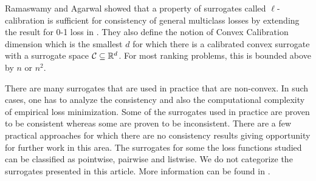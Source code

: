 Ramaswamy and Agarwal \cite{ramaswamy2016convex} showed that a property of
surrogates called $\ell$-calibration is sufficient for consistency of general
multiclass losses by extending the result for 0-1 loss in
\cite{tewari2007consistency}. They also define the notion of Convex Calibration
dimension which is the smallest $d$ for which there is a calibrated convex
surrogate with a surrogate space ${\mathcal C} \subseteq {\mathbb R}^d$. For most ranking
problems, this is bounded above by $n$ or $n^2$. 

There are many surrogates that are used in practice that are non-convex.
In such cases, one has to analyze the consistency and also the computational
complexity of empirical loss minimization. Some of the surrogates used in
practice are proven to be consistent whereas some are proven to be
inconsistent. There are a few practical approaches for which there are no
consistency results giving opportunity for further work in this area.
The surrogates for some the loss functions studied can be classified as
pointwise, pairwise and listwise. We do not categorize the surrogates
presented in this article. More information can be found in \cite{li2011short}.

